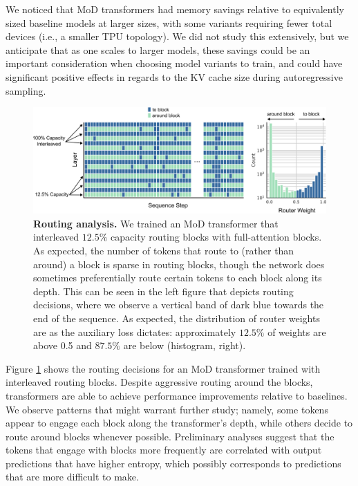 \documentclass[11pt, a4paper, onecolumn, logo, copyright]{googledeepmind}
\begin{document}
We noticed that MoD transformers had memory savings relative to equivalently sized baseline models at larger sizes, with some variants requiring fewer total devices (i.e., a smaller TPU topology). We did not study this extensively, but we anticipate that as one scales to larger models, these savings could be an important consideration when choosing model variants to train, and could have significant positive effects in regards to the KV cache size during autoregressive sampling. 

\begin{figure}[h]
    \centering
    \includegraphics[width=\textwidth]{weight_analysis.png}
    \caption{\textbf{Routing analysis.} We trained an MoD transformer that interleaved $12.5\%$ capacity routing blocks with full-attention blocks. As expected, the number of tokens that route to (rather than around) a block is sparse in routing blocks, though the network does sometimes preferentially route certain tokens to each block along its depth. This can be seen in the left figure that depicts routing decisions, where we observe a vertical band of dark blue towards the end of the sequence. As expected, the distribution of router weights are as the auxiliary loss dictates: approximately $12.5\%$ of weights are above 0.5 and $87.5\%$ are below (histogram, right).}
    \label{fig:routing-analysis}
\end{figure}

Figure \ref{fig:routing-analysis} shows the routing decisions for an MoD transformer trained with interleaved routing blocks. Despite aggressive routing around the blocks, transformers are able to achieve performance improvements relative to baselines. We observe patterns that might warrant further study; namely, some tokens appear to engage each block along the transformer's depth, while others decide to route around blocks whenever possible. Preliminary analyses suggest that the tokens that engage with blocks more frequently are correlated with output predictions that have higher entropy, which possibly corresponds to predictions that are more difficult to make.
\end{document}
